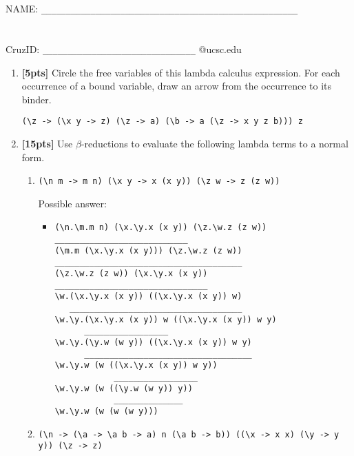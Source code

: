 \documentclass[paper=letter, fontsize=13pt]{article} %
\numberwithin{equation}{section} %
\newif\ifshowanswers\showanswerstrue
\begin{document}
\bigskip
\bigskip
\bigskip
\bigskip
\bigskip
\bigskip
\bigskip
\bigskip
\bigskip
\bigskip
\bigskip
\bigskip
\bigskip
\bigskip
\bigskip
\bigskip
\noindent NAME: \verb|____________________________________________________| \\
\bigskip\\ 
\bigskip\\
CruzID: \verb|_______________________________| @ucsc.edu

\newpage
{}

\bigskip

\begin{enumerate} 
\item \textbf{[5pts]} Circle the free variables of this lambda calculus expression. For each occurrence
  of a bound variable, draw an arrow from the occurrence to its binder.

   \vspace{4em}
  {\Large \verb|(\z -> (\x y -> z) (\z -> a) (\b -> a (\z -> x y z b))) z|}
   \vspace{4em}


\item \textbf{[15pts]} Use $\beta$-reductions to evaluate the following lambda terms to a normal form. \\
\begin{enumerate}[label*=\arabic*.]
\item \verb|(\n m -> m n) (\x y -> x (x y)) (\z w -> z (z w))|

\ifshowanswers
Possible answer: 
\begin{itemize}
\item
\begin{verbatim}
(\n.\m.m n) (\x.\y.x (x y)) (\z.\w.z (z w))
___________________________                
(\m.m (\x.\y.x (x y))) (\z.\w.z (z w))
______________________________________
(\z.\w.z (z w)) (\x.\y.x (x y))
_______________________________
\w.(\x.\y.x (x y)) ((\x.\y.x (x y)) w)
   ___________________________________
\w.\y.(\x.\y.x (x y)) w ((\x.\y.x (x y)) w y)
      _________________                      
\w.\y.(\y.w (w y)) ((\x.\y.x (x y)) w y)
      __________________________________
\w.\y.w (w ((\x.\y.x (x y)) w y))
            _________________    
\w.\y.w (w ((\y.w (w y)) y))
            ______________  
\w.\y.w (w (w (w y)))
\end{verbatim}

\end{itemize}
\else
  \framebox[0.90\textwidth]{\begin{minipage}[t][35em]{0.90\textwidth} \end{minipage}}
\fi
\newpage
\item \verb|(\n -> (\a -> \a b -> a) n (\a b -> b)) ((\x -> x x) (\y -> y y)) (\z -> z)|


\end{enumerate}
\end{enumerate}
\end{document}
